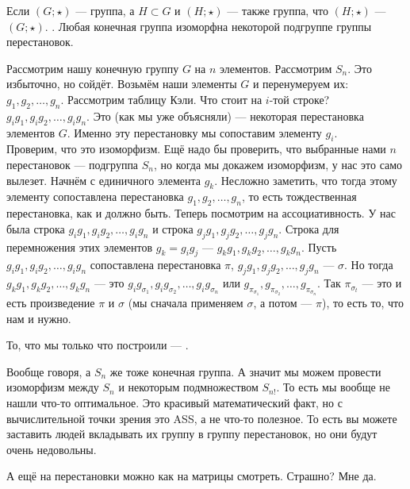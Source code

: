 \documentclass{article}
\begin{document}
\begin{itemize}
\begin{Comment}
        \end{Comment}
        \dfn Если $(G;\star)$ --- группа, а $H\subset G$ и $(H;\star)$ --- также группа, что $(H;\star)$ ---  $(G;\star)$.
        \thm {}. Любая конечная группа изоморфна некоторой подгруппе группы перестановок.
        \begin{Proof}
            Рассмотрим нашу конечную группу $G$ на $n$ элементов. Рассмотрим $S_n$. Это избыточно, но сойдёт. Возьмём наши элементы $G$ и перенумеруем их: $g_1,g_2,\ldots,g_n$. Рассмотрим таблицу Кэли. Что стоит на $i$-той строке? $g_ig_1,g_ig_2,\ldots,g_ig_n$. Это (как мы уже объясняли) --- некоторая перестановка элементов $G$. Именно эту перестановку мы сопоставим элементу $g_i$.\\
            Проверим, что это изоморфизм. Ещё надо бы проверить, что выбранные нами $n$ перестановок --- подгруппа $S_n$, но когда мы докажем изоморфизм, у нас это само вылезет. Начнём с единичного элемента $g_k$. Несложно заметить, что тогда этому элементу сопоставлена перестановка $g_1,g_2,\ldots,g_n$, то есть тождественная перестановка, как и должно быть. Теперь посмотрим на ассоциативность. У нас была строка $g_ig_1,g_ig_2,\ldots,g_ig_n$ и строка $g_jg_1,g_jg_2,\ldots,g_jg_n$. Строка для перемножения этих элементов $g_k=g_ig_j$ --- $g_kg_1,g_kg_2,\ldots,g_kg_n$. Пусть $g_ig_1,g_ig_2,\ldots,g_ig_n$ сопоставлена перестановка $\pi$, $g_jg_1,g_jg_2,\ldots,g_jg_n$ --- $\sigma$. Но тогда $g_kg_1,g_kg_2,\ldots,g_kg_n$ --- это $g_ig_{\sigma_1},g_ig_{\sigma_2},\ldots,g_ig_{\sigma_n}$ или $g_{\pi_{\sigma_1}},g_{\pi_{\sigma_2}},\ldots,g_{\pi_{\sigma_n}}$. Так $\pi_{\sigma_t}$ --- это и есть произведение $\pi$ и $\sigma$ (мы сначала применяем $\sigma$, а потом --- $\pi$), то есть то, что нам и нужно.
        \end{Proof}
        \dfn То, что мы только что построили --- .
        \begin{Comment}
            Вообще говоря, а $S_n$ же тоже конечная группа. А значит мы можем провести изоморфизм между $S_n$ и некоторым подмножеством $S_{n!}$. То есть мы вообще не нашли что-то оптимальное. Это красивый математический факт, но с вычислительной точки зрения это \mars ASS\mars, а не что-то полезное. То есть вы можете заставить людей вкладывать их группу в группу перестановок, но они будут очень недовольны.
        \end{Comment}
        \begin{Comment}
            А ещё на перестановки можно как на матрицы смотреть. Страшно? Мне да.\\

\end{Comment}
\end{itemize}
\end{document}
